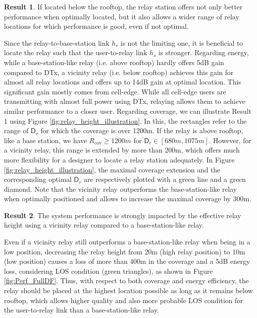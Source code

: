 \documentclass[journal]{IEEEtran}
\theoremstyle{definition}
\newtheorem{result}{Result}
\begin{document}
\vspace*{-5pt}
\begin{result}
If located below the rooftop, the relay station offers not only better performance when optimally located, but it also allows a wider range of relay locations for which performance is good, even if not optimal.
\end{result} \vspace*{-5pt} \noindent
Since the relay-to-base-station link $h_r$ is not the limiting one, it is beneficial to locate the relay such that the user-to-relay link $h_s$ is stronger. Regarding energy, while a base-station-like relay (i.e. above rooftop) hardly offers 5dB gain compared to DTx, a vicinity relay (i.e. below rooftop) achieves this gain for almost all relay locations and offers up to 14dB gain at optimal location. This significant gain mostly comes from cell-edge. While all cell-edge users are transmitting with almost full power using DTx, relaying allows them to achieve similar performance to a closer user.
Regarding coverage, we can illustrate Result 1 using Figure \ref{fig:relay_height_illustration}. 
In this, the rectangles refer to the range of $\mathsf{D}_r$ for which the coverage is over 1200m. If the relay is above rooftop, like a base station, we have $R_{\text{cov}} \geq 1200m$ for $\mathsf{D}_r \in \left[680m,1075m\right]$. However, for a vicinity relay, this range is extended by more than 200m, which offers much more flexibility for a designer to locate a relay station adequately.
In Figure \ref{fig:relay_height_illustration}, the maximal coverage extension and the corresponding optimal $\mathsf{D}_r$ are respectively plotted with a green line and a green diamond. Note that the vicinity relay outperforms the base-station-like relay when optimally positioned and allows to increase the maximal coverage by 300m.

\vspace*{-5pt}\begin{result}
The system performance is strongly impacted by the effective relay height using a vicinity relay compared to a base-station-like relay. 
\end{result} \vspace*{-5pt} \noindent
Even if a vicinity relay still outperforms a base-station-like relay when being in a low position, decreasing the relay height from 20m (high relay position) to 10m (low position) causes a loss of more than 400m in the coverage and a 5dB energy loss, considering LOS condition (green triangles), as shown in Figure \ref{fig:Perf_FullDF}. Thus, with respect to both coverage and energy efficiency, the relay should be placed at the highest location possible as long as it remains below rooftop, which allows higher quality and also more probable LOS condition for the user-to-relay link than a base-station-like relay.
\end{document}
